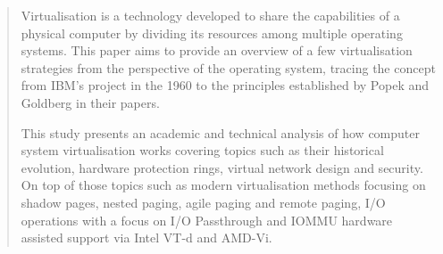 \begin{abstract}
Virtualisation is a technology developed to share the capabilities of a physical computer by dividing its resources among multiple operating systems. This paper aims to provide an overview of a few virtualisation strategies from the perspective of the operating system, tracing the concept from IBM’s project in the 1960 to the principles established by Popek and Goldberg in their papers. 


This study presents an academic and technical analysis of how computer system virtualisation works covering topics such as their historical evolution, hardware protection rings, virtual network design and security. On top of those topics such as modern virtualisation methods focusing on shadow pages, nested paging, agile paging and remote paging, I/O operations with a focus on I/O Passthrough and IOMMU hardware assisted support via Intel VT-d and AMD-Vi.
\end{abstract}
